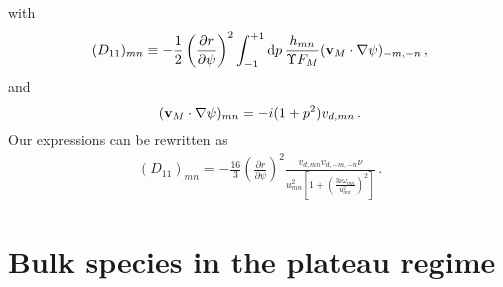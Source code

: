 with
\begin{equation}
(D_{11})_{mn} \equiv -\frac{1}{2}\left(\frac{\partial r}{\partial\psi}\right)^2\int_{-1}^{+1}\mathrm{d}p\,\frac{h_{mn}}{\Upsilon F_M}({\mathbf{v}}_M\cdot\mathbf{\nabla}\psi)_{-m,-n}\,,
\end{equation}
and
\begin{equation}
 ({\mathbf{v}}_M\cdot\mathbf{\nabla}\psi)_{mn} = -i(1+p^2)v_{d,mn}\,.
\end{equation}
Our expressions can be rewritten as
\begin{eqnarray}
(D_{11})_{mn}= -\frac{16}{3}\left(\frac{\partial r}{\partial\psi}\right)^2\frac{v_{d,mn}v_{d,-m,-n}\nu}{u_{mn}^2\left[1+\left(\frac{3\nu\omega_{mn}}{u_{mn}^2}\right)^2\right]}\,.\label{EQ_D11PS}
\end{eqnarray}



\section{Bulk species in the plateau regime}\label{SEC_PLATEAU}

